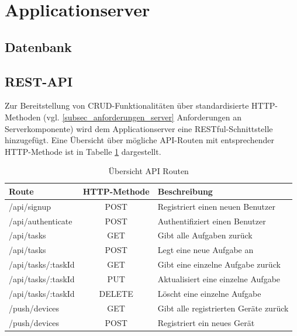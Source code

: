 \newpage
\section{Applicationserver}
\label{sec_konzeption_applicationserver}

\subsection{Datenbank}



\subsection{REST-API}

Zur Bereitstellung von CRUD-Funktionalitäten über standardisierte HTTP-Methoden (vgl. \ref{subsec_anforderungen_server} Anforderungen an Serverkomponente) wird dem Applicationserver eine RESTful-Schnittstelle hinzugefügt. Eine Übersicht über mögliche API-Routen mit entsprechender HTTP-Methode ist in Tabelle \ref{tbl_konzeption_rest} dargestellt. \\

\begin{table}[h]
\centering
\begin{tabular}{l | c | l }
    \textbf{Route} & \textbf{HTTP-Methode} & \textbf{Beschreibung} \\
    \hline\hline
    /api/signup & POST & Registriert einen neuen Benutzer \\
    /api/authenticate & POST & Authentifiziert einen Benutzer \\
    \hline
    /api/tasks & GET & Gibt alle Aufgaben zurück \\
    /api/tasks & POST & Legt eine neue Aufgabe an \\
    /api/tasks/:taskId & GET & Gibt eine einzelne Aufgabe zurück \\
    /api/tasks/:taskId & PUT & Aktualisiert eine einzelne Aufgabe \\
    /api/tasks/:taskId & DELETE & Löscht eine einzelne Aufgabe \\
    \hline
    /push/devices & GET & Gibt alle registrierten Geräte zurück \\
    /push/devices & POST & Registriert ein neues Gerät \\
\end{tabular}
\caption{Übersicht API Routen}
\label{tbl_konzeption_rest}
\end{table}

